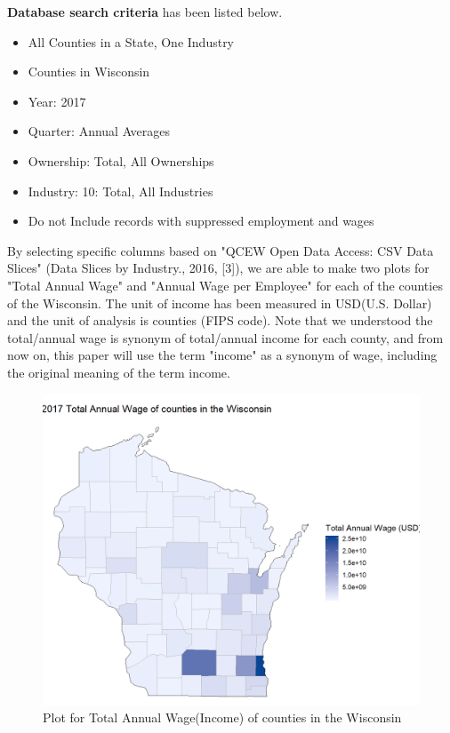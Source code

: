 \documentclass[letterpaper, 10 pt, conference]{ieeeconf}  %
\begin{document}
\textbf{Database search criteria} has been listed below.

\begin{itemize}

\item All Counties in a State, One Industry
\item Counties in Wisconsin
\item Year: 2017
\item Quarter: Annual Averages
\item Ownership: Total, All Ownerships
\item Industry: 10: Total, All Industries
\item Do not Include records with suppressed employment and wages

\end{itemize}
\vspace{1\baselineskip}

By selecting specific columns based on "QCEW Open Data Access: CSV Data Slices" (Data Slices by Industry., 2016, [3]), we are able to make two plots for "Total Annual Wage" and "Annual Wage per Employee" for each of the counties of the Wisconsin.
The unit of income has been measured in USD(U.S. Dollar) and the unit of analysis is counties (FIPS code).
Note that we understood the total/annual wage is synonym of total/annual income for each county, and from now on, this paper will use the term "income" as a synonym of wage, including the original meaning of the term income.

\begin{figure}[h]
\begin{center}
\includegraphics[width=1.0\linewidth]{2017_Total_Annual_Wage.png}
\end{center}
\caption{Plot for Total Annual Wage(Income) of counties in the Wisconsin}
\label{fig:long}
\label{fig:onecol}
\end{figure}
\end{document}
